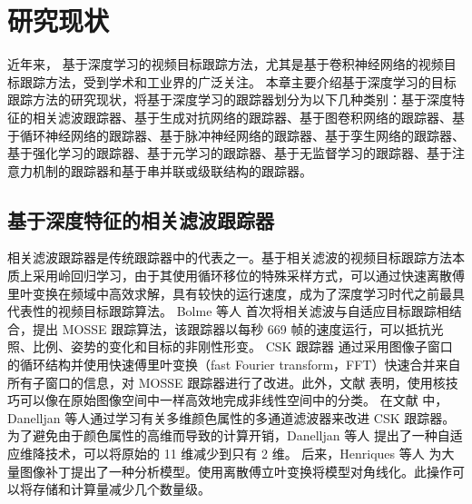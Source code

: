 \chapter{研究现状} \label{chap:related}
近年来，
基于深度学习的视频目标跟踪方法，尤其是基于卷积神经网络的视频目标跟踪方法，受到学术和工业界的广泛关注。
本章主要介绍基于深度学习的目标跟踪方法的研究现状，将基于深度学习的跟踪器划分为以下几种类别：基于深度特征的相关滤波跟踪器、基于生成对抗网络的跟踪器、基于图卷积网络的跟踪器、基于循环神经网络的跟踪器、基于脉冲神经网络的跟踪器、基于孪生网络的跟踪器、基于强化学习的跟踪器、基于元学习的跟踪器、基于无监督学习的跟踪器、基于注意力机制的跟踪器和基于串并联或级联结构的跟踪器。

\section{基于深度特征的相关滤波跟踪器}
相关滤波跟踪器是传统跟踪器中的代表之一。基于相关滤波的视频目标跟踪方法本质上采用岭回归学习，由于其使用循环移位的特殊采样方式，可以通过快速离散傅里叶变换在频域中高效求解，具有较快的运行速度，成为了深度学习时代之前最具代表性的视频目标跟踪算法。
Bolme 等人 \cite{MOSSE} 首次将相关滤波与自适应目标跟踪相结合，提出 MOSSE 跟踪算法，该跟踪器以每秒 669 帧的速度运行，可以抵抗光照、比例、姿势的变化和目标的非刚性形变。
CSK 跟踪器 \cite{Henriques2012ExploitingTC} 通过采用图像子窗口的循环结构并使用快速傅里叶变换（fast Fourier transform，FFT）快速合并来自所有子窗口的信息，对 MOSSE 跟踪器进行了改进。此外，文献 \cite{Henriques2012ExploitingTC} 表明，使用核技巧可以像在原始图像空间中一样高效地完成非线性空间中的分类。
在文献 \cite{Danelljan2014AdaptiveCA} 中，Danelljan 等人通过学习有关多维颜色属性的多通道滤波器来改进 CSK 跟踪器。为了避免由于颜色属性的高维而导致的计算开销，Danelljan 等人 \cite{Danelljan2014AdaptiveCA} 提出了一种自适应维降技术，可以将原始的 11 维减少到只有 2 维。
后来，Henriques 等人 \cite{henriques2014high-speed} 为大量图像补丁提出了一种分析模型。使用离散傅立叶变换将模型对角线化。此操作可以将存储和计算量减少几个数量级。

